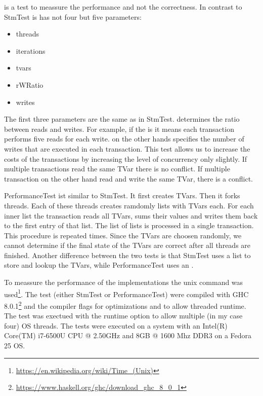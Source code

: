  is a test to meassure the performance and not the correctness. In contrast to StmTest is has not four but
five parameters:
\begin{itemize}
 \item threads
 \item iterations
 \item tvars
 \item rWRatio
 \item writes
\end{itemize}
The first three parameters are the same as in StmTest.  determines the ratio between reads and writes. For example, if
the  is  it means each transaction performs five reads for each write.  on the other hands specifies
the number of writes that are executed in each transaction. This test allows us to increase the costs of the transactions by 
increasing the level of concurrency only slightly. If multiple transactions read the same TVar there is no conflict. If multiple
transaction on the other hand read and write the same TVar, there is a conflict. 

PerformanceTest ist similar to StmTest. It first creates  TVars. Then it forks  threads. Each of these 
threads creates ramdomly  lists with  TVars each. For each inner list the transaction reads all TVars,
sums their values and writes them back to the first entry of that list. The list of lists is processed in a single transaction. 
This procedure is repeated  times. Since the TVars are choosen randomly, we cannot determine if the final state
of the TVars are correct after all threads are finished. Another difference between the two tests is that StmTest uses a list to 
store and lookup the TVars, while PerformanceTest uses an .

To meassure the performance of the implementations the unix  command was used\footnote{\url{https://en.wikipedia.org/wiki/Time_(Unix)}}.
The test (either StmTest or PerformanceTest) were compiled with GHC 8.0.1\footnote{\url{https://www.haskell.org/ghc/download_ghc_8_0_1}} and the 
compiler flags  for optimizations and  to allow threaded runtime. The test was exectued with the runtime option  
to allow multiple (in my case four) OS threads. The tests were executed on a system with an Intel(R) Core(TM) i7-6500U CPU @ 2.50GHz and 
8GB @ 1600 Mhz DDR3 on a Fedora 25 OS. 


